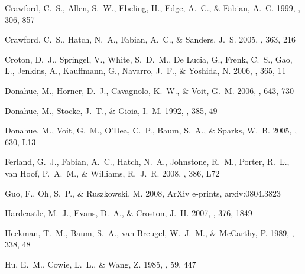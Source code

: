 \documentclass[12pt,preprint]{aastex}
\begin{document}
\begin{thebibliography}{}
{Crawford}, C.~S., {Allen}, S.~W., {Ebeling}, H., {Edge}, A.~C., \& {Fabian},
  A.~C. 1999, \mnras, 306, 857

{Crawford}, C.~S., {Hatch}, N.~A., {Fabian}, A.~C., \& {Sanders}, J.~S. 2005,
  \mnras, 363, 216

{Croton}, D.~J., {Springel}, V., {White}, S.~D.~M., {De Lucia}, G., {Frenk},
  C.~S., {Gao}, L., {Jenkins}, A., {Kauffmann}, G., {Navarro}, J.~F., \&
  {Yoshida}, N. 2006, \mnras, 365, 11

{Donahue}, M., {Horner}, D.~J., {Cavagnolo}, K.~W., \& {Voit}, G.~M. 2006,
  \apj, 643, 730

{Donahue}, M., {Stocke}, J.~T., \& {Gioia}, I.~M. 1992, \apj, 385, 49

{Donahue}, M., {Voit}, G.~M., {O'Dea}, C.~P., {Baum}, S.~A., \& {Sparks}, W.~B.
  2005, \apjl, 630, L13

{Ferland}, G.~J., {Fabian}, A.~C., {Hatch}, N.~A., {Johnstone}, R.~M.,
  {Porter}, R.~L., {van Hoof}, P.~A.~M., \& {Williams}, R.~J.~R. 2008, \mnras,
  386, L72

{Guo}, F., {Oh}, S.~P., \& {Ruszkowski}, M. 2008, ArXiv e-prints,
  arxiv:0804.3823

{Hardcastle}, M.~J., {Evans}, D.~A., \& {Croston}, J.~H. 2007, \mnras, 376,
  1849

{Heckman}, T.~M., {Baum}, S.~A., {van Breugel}, W.~J.~M., \& {McCarthy}, P.
  1989, \apj, 338, 48

{Hu}, E.~M., {Cowie}, L.~L., \& {Wang}, Z. 1985, \apjs, 59, 447


\end{thebibliography}
\end{document}
